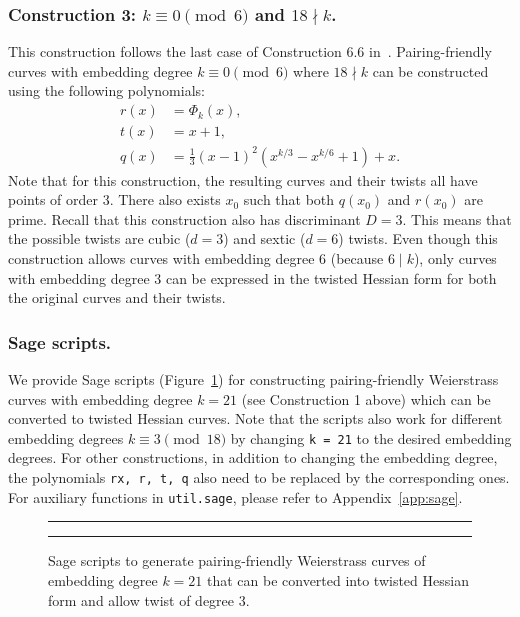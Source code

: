 
\subsubsection{Construction 3: $k \equiv 0 \pmod{6}$ and $18 \nmid k$.}
\label{con3}

This construction follows the last case of {Construction 6.6} in~\cite{2010/freeman}.
Pairing-friendly curves with embedding degree $k \equiv 0 \pmod{6}$ where $18 \nmid k$
can be constructed using the following polynomials:
\begin{align*}
r(x) &= \Phi_k(x),	\\
t(x) &= x+1,		\\
q(x) &= \frac{1}{3} (x-1)^2 (x^{k/3} - x^{k/6} + 1) + x.
\end{align*}
Note that for this construction,
the resulting curves and their twists all have points of order 3.
There also exists $x_0$ such that both $q(x_0)$ and $r(x_0)$ are prime.
Recall that this construction also has discriminant $D = 3$.
This means that the possible twists are  cubic ($d=3$) and sextic ($d=6$) twists.
Even though this construction allows curves with embedding degree $6$ (because $6 \mid k$),
only curves with embedding degree $3$ can be expressed in the twisted Hessian form
for both the original curves and their twists.


\subsubsection{Sage scripts.}
We provide Sage scripts (Figure~\ref{fig:sscript})
for constructing pairing-friendly Weierstrass curves with embedding degree $k = 21$
(see Construction 1 above)
which can be converted to twisted Hessian curves.
Note that the scripts also work for different embedding degrees $k \equiv 3 \pmod{18}$ 
by changing \texttt{k = 21} to the desired embedding degrees.
For other constructions,
in addition to changing the embedding degree,
the polynomials \texttt{rx, r, t, q} also need to be replaced by the corresponding ones.
For auxiliary functions in \texttt{util.sage}, please refer to Appendix~\ref{app:sage}.

\begin{figure}
\hrule\medskip
{}
\hrule
\caption{Sage scripts to generate pairing-friendly Weierstrass curves of embedding degree $k = 21$
that can be converted into twisted Hessian form and allow twist of degree 3.}
\label{fig:sscript}
\end{figure}

